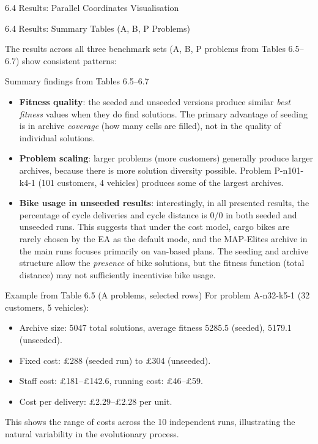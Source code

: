 \documentclass[aspectratio=169,10pt]{beamer}
\begin{document}
\begin{frame}[allowframebreaks]{6.4 Results: Parallel Coordinates Visualisation}
\end{frame}

\begin{frame}[allowframebreaks]{6.4 Results: Summary Tables (A, B, P Problems)}

The results across all three benchmark sets (A, B, P problems from
Tables 6.5--6.7) show consistent patterns:

\medskip
\begin{block}{Summary findings from Tables 6.5--6.7}
\begin{itemize}
  \item \textbf{Fitness quality}: the seeded and unseeded versions
        produce similar \emph{best fitness} values when they do find
        solutions.
        The primary advantage of seeding is in archive \emph{coverage}
        (how many cells are filled), not in the quality of individual
        solutions.
  \item \textbf{Problem scaling}: larger problems (more customers)
        generally produce larger archives, because there is more
        solution diversity possible.
        Problem P-n101-k4-1 (101 customers, 4 vehicles) produces some
        of the largest archives.
  \item \textbf{Bike usage in unseeded results}: interestingly, in
        all presented results, the percentage of cycle deliveries
        and cycle distance is 0/0 in both seeded and unseeded runs.
        This suggests that under the cost model, cargo bikes are rarely
        chosen by the EA as the default mode, and the MAP-Elites
        archive in the main runs focuses primarily on van-based plans.
        The seeding and archive structure allow the \emph{presence}
        of bike solutions, but the fitness function (total distance)
        may not sufficiently incentivise bike usage.
\end{itemize}
\end{block}

\medskip
\begin{exampleblock}{Example from Table 6.5 (A problems, selected rows)}
For problem A-n32-k5-1 (32 customers, 5 vehicles):
\begin{itemize}
  \item Archive size: 5047 total solutions, average fitness 5285.5
        (seeded), 5179.1 (unseeded).
  \item Fixed cost: \pounds288 (seeded run) to \pounds304 (unseeded).
  \item Staff cost: \pounds181--\pounds142.6, running cost: \pounds46--\pounds59.
  \item Cost per delivery: \pounds2.29--\pounds2.28 per unit.
\end{itemize}
This shows the range of costs across the 10 independent runs,
illustrating the natural variability in the evolutionary process.
\end{exampleblock}

\end{frame}
\end{document}
